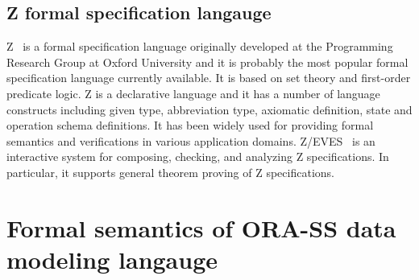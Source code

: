 \documentclass{entcs}
\begin{document}
\subsection{Z formal specification langauge}

Z~\cite{wood96} is a formal specification language originally
developed at the Programming Research Group at Oxford University
and it is probably the most popular formal specification language
currently available. It is based on set theory and first-order
predicate logic. Z is a declarative language and it has a number
of language constructs including given type, abbreviation type,
axiomatic definition, state and operation schema definitions. It
has been widely used for providing formal semantics and
verifications in various
application domains. %
%
Z/EVES~\cite{saaltink97zeves} is an interactive system for
composing, checking, and analyzing Z specifications. In
particular, it supports general theorem proving of Z
specifications.
%

\section{Formal semantics of ORA-SS data modeling langauge}
%
\end{document}
